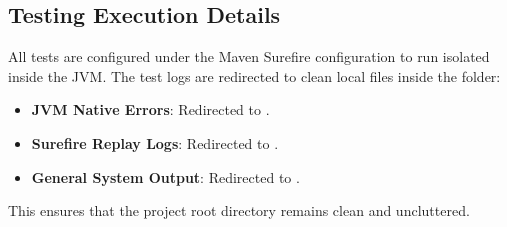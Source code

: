 \subsection{Testing Execution Details}
All tests are configured under the Maven Surefire configuration to run isolated inside the JVM. 
The test logs are redirected to clean local files inside the  folder:
\begin{itemize}
    \item \textbf{JVM Native Errors}: Redirected to .
    \item \textbf{Surefire Replay Logs}: Redirected to .
    \item \textbf{General System Output}: Redirected to .
\end{itemize}
This ensures that the project root directory remains clean and uncluttered.

